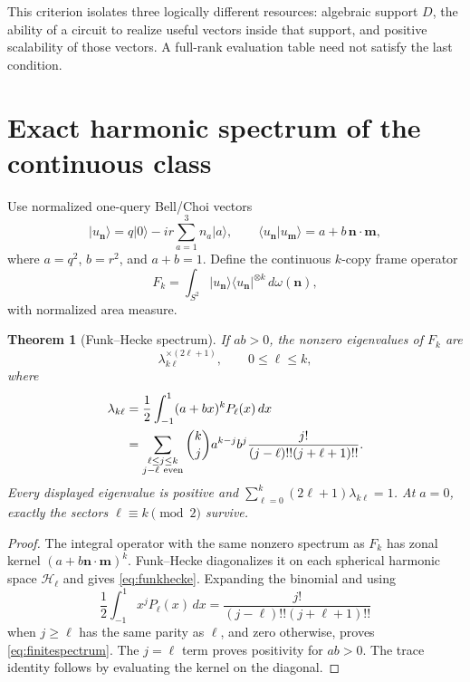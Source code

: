 \documentclass[11pt]{article}
\newtheorem{theorem}{Theorem}[section]
\theoremstyle{definition}
\theoremstyle{remark}
\newcommand{\cH}{\mathcal H}
\newcommand{\ket}[1]{\lvert #1\rangle}
\newcommand{\bra}[1]{\langle #1\rvert}
\begin{document}
This criterion isolates three logically different resources: algebraic
support $D$, the ability of a circuit to realize useful vectors inside that
support, and positive scalability of those vectors.  A full-rank evaluation
table need not satisfy the last condition.

\section{Exact harmonic spectrum of the continuous class}

Use normalized one-query Bell/Choi vectors
\begin{equation}
 \ket{u_{\bm n}}=q\ket0-ir\sum_{a=1}^3n_a\ket a,
 \qquad
 \langle u_{\bm n}|u_{\bm m}\rangle=a+b\,\bm n\cdot\bm m,
\end{equation}
where $a=q^2$, $b=r^2$, and $a+b=1$.  Define the continuous $k$-copy frame
operator
\begin{equation}\label{eq:frame}
 F_k=\int_{S^2}
 \ket{u_{\bm n}}\!\bra{u_{\bm n}}^{\otimes k}\,d\omega(\bm n),
\end{equation}
with normalized area measure.

\begin{theorem}[Funk--Hecke spectrum]\label{thm:spectrum}
If $ab>0$, the nonzero eigenvalues of $F_k$ are
\begin{equation}\label{eq:lambdaspectrum}
 \lambda_{k\ell}^{\times(2\ell+1)},\qquad 0\leq\ell\leq k,
\end{equation}
where
\begin{align}
 \lambda_{k\ell}
 &=\frac12\int_{-1}^{1}(a+bx)^kP_\ell(x)\,dx\label{eq:funkhecke}\\
 &=\sum_{\substack{\ell\leq j\leq k\\j-\ell\ {\rm even}}}
 \binom{k}{j}a^{k-j}b^j
 \frac{j!}{(j-\ell)!!(j+\ell+1)!!}.\label{eq:finitespectrum}
\end{align}
Every displayed eigenvalue is positive and
$\sum_{\ell=0}^k(2\ell+1)\lambda_{k\ell}=1$.
At $a=0$, exactly the sectors $\ell\equiv k\pmod2$ survive.
\end{theorem}

\begin{proof}
The integral operator with the same nonzero spectrum as $F_k$ has zonal
kernel $(a+b\bm n\cdot\bm m)^k$.  Funk--Hecke diagonalizes it on each
spherical harmonic space $\cH_\ell$ and gives \cref{eq:funkhecke}.  Expanding
the binomial and using
\begin{equation}
 \frac12\int_{-1}^1x^jP_\ell(x)\,dx
 =\frac{j!}{(j-\ell)!!(j+\ell+1)!!}
\end{equation}
when $j\geq\ell$ has the same parity as $\ell$, and zero otherwise, proves
\cref{eq:finitespectrum}.  The $j=\ell$ term proves positivity for $ab>0$.
The trace identity follows by evaluating the kernel on the diagonal.
\end{proof}
\end{document}
